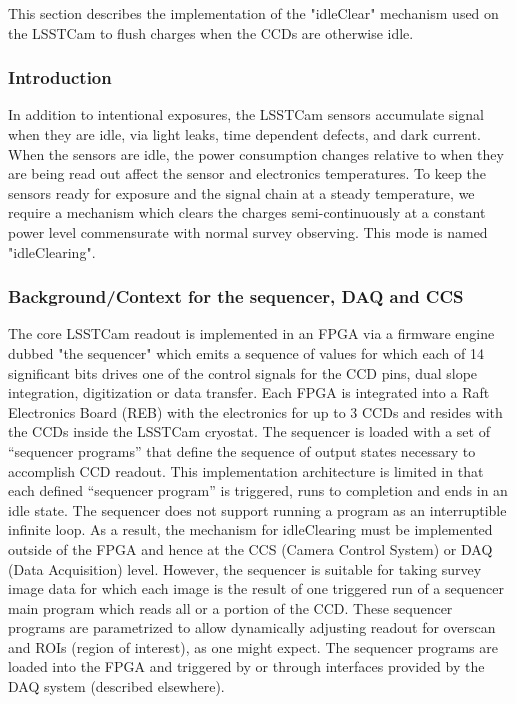 This section describes the implementation of the "idleClear" mechanism used on the LSSTCam to flush charges when the CCDs are otherwise idle.




\subsubsection{Introduction}
In addition to intentional exposures, the LSSTCam sensors accumulate signal when they are idle, via light leaks, time dependent defects, and dark current.  When the sensors are idle, the power consumption changes relative to when they are being read out affect the sensor and electronics temperatures. To keep the sensors ready for exposure and the signal chain at a steady temperature, we require a mechanism which clears the charges semi-continuously at a constant power level commensurate with normal survey observing. This mode is named "idleClearing".

\subsubsection{Background/Context for the sequencer, DAQ and CCS}

The core LSSTCam readout is implemented in an FPGA via a firmware engine dubbed "the sequencer" which emits a sequence of values for which each of 14 significant bits drives one of the control signals for the CCD pins, dual slope integration, digitization or data transfer.  Each FPGA is integrated into a Raft Electronics Board (REB) with the electronics for up to 3 CCDs and resides with the CCDs inside the LSSTCam cryostat.  The sequencer is loaded with a set of ``sequencer programs'' that define the sequence of output states necessary to accomplish CCD readout.  This implementation architecture is limited in that each defined ``sequencer program'' is triggered, runs to completion and ends in an idle state.  The sequencer does not support running a program as an interruptible infinite loop.  As a result, the mechanism for idleClearing must be implemented outside of the FPGA and hence at the CCS (Camera Control System) or DAQ (Data Acquisition) level. However, the sequencer is suitable for taking survey image data for which each image is the result of one triggered run of a sequencer main program which reads all or a portion of the CCD. These sequencer programs are parametrized to allow dynamically adjusting readout for overscan and ROIs (region of interest), as one might expect. The sequencer programs are loaded into the FPGA and triggered by or through interfaces provided by the DAQ system (described elsewhere). 


